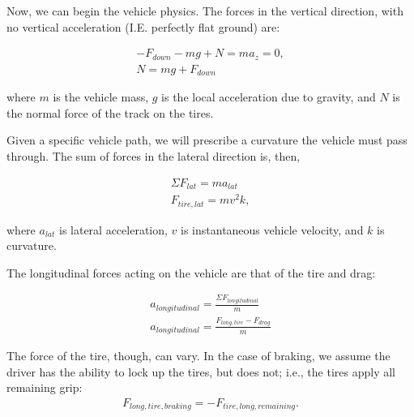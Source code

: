 \documentclass{article}
\begin{document}
Now, we can begin the vehicle physics. The forces in the vertical direction, with no vertical acceleration (I.E. perfectly flat ground) are:

\begin{align}
    -F_{down} -m g + N = m a_{z} = 0, \\
    N = m g + F_{down} \label{eq_z}
\end{align}

where $m$ is the vehicle mass, $g$ is the local acceleration due to gravity, and $N$ is the normal force of the track on the tires.

Given a specific vehicle path, we will prescribe a curvature the vehicle must pass through. The sum of forces in the lateral direction is, then,

\begin{align}
    \Sigma F_{lat} = m a_{lat} \\
    F_{tire,lat} = m v^2 k, \label{eq_lateral}
\end{align}

where $a_{lat}$ is lateral acceleration, $v$ is instantaneous vehicle velocity, and $k$ is curvature.


%

The longitudinal forces acting on the vehicle are that of the tire and drag:

\begin{align}
    a_{longitudinal} = \frac{\Sigma F_{longitudinal}}{m}\\
    a_{longitudinal} = \frac{F_{long,tire} - F_{drag} }{m} \label{eq_accel}
\end{align}

The force of the tire, though, can vary. In the case of braking, we assume the driver has the ability to lock up the tires, but does not; i.e., the tires apply all remaining grip: 
\begin{align}
F_{long,tire,braking} = -F_{tire,long,remaining}. \label{eq_accel_brake}
\end{align}
\end{document}
